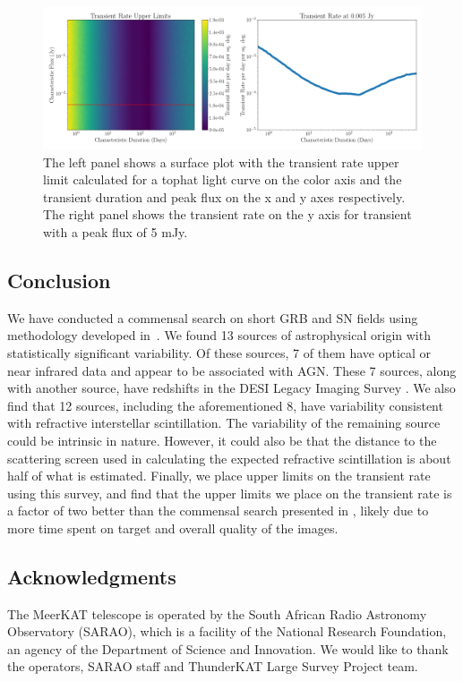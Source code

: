\documentclass[12pt]{article}
\begin{document}
\begin{figure}
	\includegraphics[width=\textwidth]{commensal2_30min.png}
	\caption{The left panel shows a surface plot with the transient rate upper limit calculated for a tophat light curve on the color axis and the transient duration and peak flux on the x and y axes respectively. The right panel shows the transient rate on the y axis for transient with a peak flux of 5 mJy. }
	\label{fig:transientrate}
 \end{figure}
\subsection{Conclusion}
\label{sec:conclusion3}
We have conducted a commensal search on short GRB and SN fields using methodology developed in~\citet{commensal1}. We found 13 sources of astrophysical origin with statistically significant variability. Of these sources, 7 of them have optical or near infrared data and appear to be associated with AGN. These 7 sources, along with another source, have redshifts in the DESI Legacy Imaging Survey \citep{10.1093...mnras...stac608}. We also find that 12 sources, including the aforementioned 8, have variability consistent with refractive interstellar scintillation. The variability of the remaining source could be intrinsic in nature. However, it could also be that the distance to the scattering screen used in calculating the expected refractive scintillation is about half of what is estimated. Finally, we place upper limits on the transient rate using this survey, and find that the upper limits we place on the transient rate is a factor of two better than the commensal search presented in \citet{commensal1}, likely due to more time spent on target and overall quality of the images.






\subsection{Acknowledgments}
The MeerKAT telescope is operated by the South African Radio Astronomy Observatory (SARAO), which is a facility of the National Research Foundation, an agency of the Department of Science and Innovation. We would like to thank the operators, SARAO staff and ThunderKAT Large Survey Project team.
\end{document}
